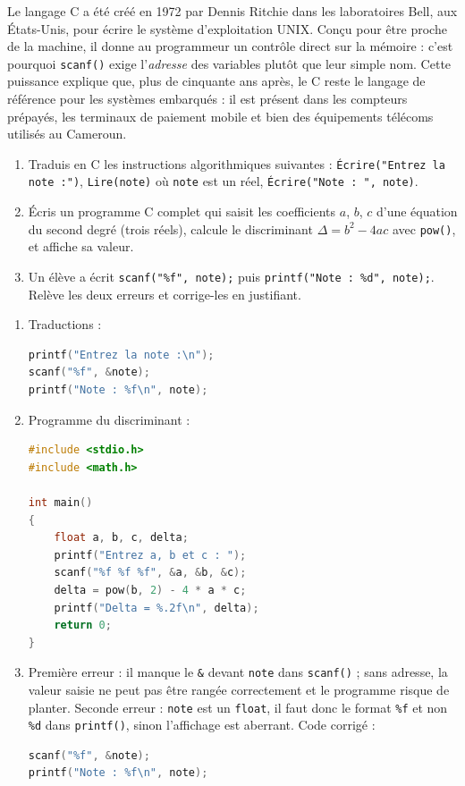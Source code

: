 \documentclass[11pt]{article}
\begin{document}
\begin{savaistu}
Le langage C a été créé en 1972 par Dennis Ritchie dans les laboratoires Bell, aux États-Unis, pour écrire le système d'exploitation UNIX. Conçu pour être proche de la machine, il donne au programmeur un contrôle direct sur la mémoire : c'est pourquoi \texttt{scanf()} exige l'\emph{adresse} des variables plutôt que leur simple nom. Cette puissance explique que, plus de cinquante ans après, le C reste le langage de référence pour les systèmes embarqués : il est présent dans les compteurs prépayés, les terminaux de paiement mobile et bien des équipements télécoms utilisés au Cameroun.
\end{savaistu}

\begin{exercice}
\begin{enumerate}
\item Traduis en C les instructions algorithmiques suivantes : \texttt{Écrire("Entrez la note :")}, \texttt{Lire(note)} où \texttt{note} est un réel, \texttt{Écrire("Note : ", note)}.
\item Écris un programme C complet qui saisit les coefficients $a$, $b$, $c$ d'une équation du second degré (trois réels), calcule le discriminant $\Delta = b^2 - 4ac$ avec \texttt{pow()}, et affiche sa valeur.
\item Un élève a écrit \texttt{scanf("\%f", note);} puis \texttt{printf("Note : \%d", note);}. Relève les deux erreurs et corrige-les en justifiant.
\end{enumerate}
\end{exercice}

\begin{corrige}[Exercice n°1]
\begin{enumerate}
\item Traductions :
\begin{lstlisting}[language=C]
printf("Entrez la note :\n");
scanf("%f", &note);
printf("Note : %f\n", note);
\end{lstlisting}
\item Programme du discriminant :
\begin{lstlisting}[language=C]
#include <stdio.h>
#include <math.h>

int main()
{
    float a, b, c, delta;
    printf("Entrez a, b et c : ");
    scanf("%f %f %f", &a, &b, &c);
    delta = pow(b, 2) - 4 * a * c;
    printf("Delta = %.2f\n", delta);
    return 0;
}
\end{lstlisting}
\item Première erreur : il manque le \texttt{\&} devant \texttt{note} dans \texttt{scanf()} ; sans adresse, la valeur saisie ne peut pas être rangée correctement et le programme risque de planter. Seconde erreur : \texttt{note} est un \texttt{float}, il faut donc le format \texttt{\%f} et non \texttt{\%d} dans \texttt{printf()}, sinon l'affichage est aberrant. Code corrigé :
\begin{lstlisting}[language=C]
scanf("%f", &note);
printf("Note : %f\n", note);
\end{lstlisting}
\end{enumerate}
\end{corrige}
\end{document}
